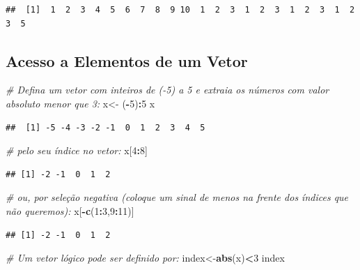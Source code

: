 \documentclass[
]{book}
\newenvironment{Shaded}{\begin{snugshade}}{\end{snugshade}}
\newcommand{\CommentTok}[1]{\textcolor[rgb]{0.56,0.35,0.01}{\textit{#1}}}
\newcommand{\DecValTok}[1]{\textcolor[rgb]{0.00,0.00,0.81}{#1}}
\newcommand{\FunctionTok}[1]{\textcolor[rgb]{0.13,0.29,0.53}{\textbf{#1}}}
\newcommand{\NormalTok}[1]{#1}
\newcommand{\OtherTok}[1]{\textcolor[rgb]{0.56,0.35,0.01}{#1}}
\newcommand{\SpecialCharTok}[1]{\textcolor[rgb]{0.81,0.36,0.00}{\textbf{#1}}}
\theoremstyle{definition}
\theoremstyle{definition}
\theoremstyle{definition}
\theoremstyle{definition}
\theoremstyle{remark}
\begin{document}
\begin{verbatim}
##  [1]  1  2  3  4  5  6  7  8  9 10  1  2  3  1  2  3  1  2  3  1  2  3  5
\end{verbatim}

\subsection{Acesso a Elementos de um Vetor}\label{acesso-a-elementos-de-um-vetor}

\begin{Shaded}
\begin{Highlighting}[]
\CommentTok{\# Defina um vetor com inteiros de ({-}5) a 5 e extraia os números com valor absoluto menor que 3:}
\NormalTok{x}\OtherTok{\textless{}{-}}\NormalTok{ (}\SpecialCharTok{{-}}\DecValTok{5}\NormalTok{)}\SpecialCharTok{:}\DecValTok{5}
\NormalTok{x}
\end{Highlighting}
\end{Shaded}

\begin{verbatim}
##  [1] -5 -4 -3 -2 -1  0  1  2  3  4  5
\end{verbatim}

\begin{Shaded}
\begin{Highlighting}[]
\CommentTok{\# pelo seu índice no vetor:}
\NormalTok{x[}\DecValTok{4}\SpecialCharTok{:}\DecValTok{8}\NormalTok{]}
\end{Highlighting}
\end{Shaded}

\begin{verbatim}
## [1] -2 -1  0  1  2
\end{verbatim}

\begin{Shaded}
\begin{Highlighting}[]
\CommentTok{\# ou, por seleção negativa (coloque um sinal de menos na frente dos índices que não queremos):}
\NormalTok{x[}\SpecialCharTok{{-}}\FunctionTok{c}\NormalTok{(}\DecValTok{1}\SpecialCharTok{:}\DecValTok{3}\NormalTok{,}\DecValTok{9}\SpecialCharTok{:}\DecValTok{11}\NormalTok{)]}
\end{Highlighting}
\end{Shaded}

\begin{verbatim}
## [1] -2 -1  0  1  2
\end{verbatim}

\begin{Shaded}
\begin{Highlighting}[]
\CommentTok{\# Um vetor lógico pode ser definido por:}
\NormalTok{index}\OtherTok{\textless{}{-}}\FunctionTok{abs}\NormalTok{(x)}\SpecialCharTok{\textless{}}\DecValTok{3}
\NormalTok{index }
\end{Highlighting}
\end{Shaded}
\end{document}
